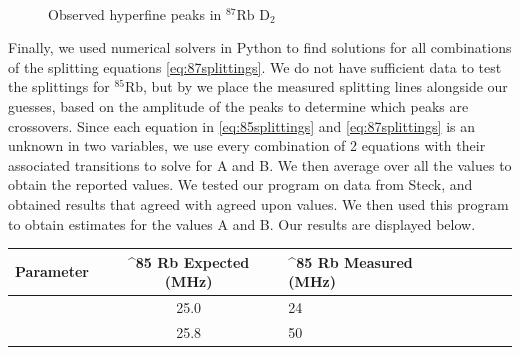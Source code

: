 \documentclass[12pt]{article}
\begin{document}
\begin{figure}[ht!]
\begin{center}
{		}\\%
	\end{center}
	\caption{%
		Observed hyperfine peaks in ${}^{87}\text{Rb D}_2$
	}%
	\label{fig:87Hyperfine}
\end{figure}

Finally, we used numerical solvers in Python to find solutions for all combinations of the splitting equations \ref{eq:87splittings}.  We do not have sufficient data to test the splittings for $^{85}$Rb, but by we place the measured splitting lines alongside our guesses, based on the amplitude of the peaks to determine which peaks are crossovers.  Since each equation in \ref{eq:85splittings} and \ref{eq:87splittings} is an unknown in two variables, we use every combination of 2 equations with their associated transitions to solve for A and B.  We then average over all the values to obtain the reported values.  We tested our program on data from Steck\cite{steck85Rb}\cite{steck87Rb}, and obtained results that agreed with agreed upon values.  We then used this program to obtain estimates for the values A and B.  Our results are displayed below.

\begin{center}
	\begin{tabular}{| L|c | L|c |L|c|}
		\hline
		\textbf{Parameter} & {}^{85}\textbf{ Rb Expected (MHz)} & {}^{85}\textbf{ Rb Measured (MHz)}\\ 
		\hline
		 & 25.0 &  24\\ 
		\hline
		 & 25.8 & 50\\ 
		\hline
	\end{tabular}
\end{center}
\end{document}
